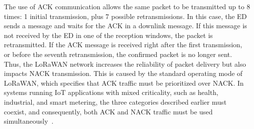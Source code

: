 \documentclass[a4paper,fleqn]{cas-dc}
\begin{document}
The use of \gls{ACK} communication allows the same packet to be transmitted up to 8 times: 1 initial transmission, plus 7 possible retransmissions. In this case, the ED sends a message and waits for the \gls{ACK} in a downlink message. If this message is not received by the ED in one of the reception windows, the packet is retransmitted. If the \gls{ACK} message is received right after the first transmission, or before the seventh retransmission, the confirmed packet is no longer sent. Thus, the \gls{LoRaWAN} network increases the reliability of packet delivery but also impacts \gls{NACK} transmission. This is caused by the standard operating mode of \gls{LoRaWAN}, which specifies that \gls{ACK} traffic must be prioritized over \gls{NACK}. In systems running \gls{IoT} applications with mixed criticality, such as health, industrial, and smart metering, the three categories described earlier must coexist, and consequently, both \gls{ACK} and \gls{NACK} traffic must be used simultaneously~\cite{wei2023priority}.

\end{document}
